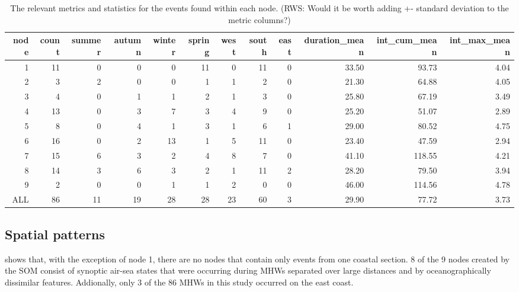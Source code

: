 \documentclass[a4paper,10pt,review]{elsarticle}
\begin{document}
\begin{table}[ht]
\caption{\small The relevant metrics and statistics for the events found within each node. 
(RWS: Would it be worth adding +- standard deviation to the metric columns?)}
\label{table2}
\centering
\tiny
\begin{tabular}{rrrrrrrrrrrr}
  \toprule
node & count & summer & autumn & winter & spring & west & south & east & duration\_mean & int\_cum\_mean & int\_max\_mean \\ 
  \midrule
  1 &  11 &   0 &   0 &   0 &  11 &   0 &  11 &   0 & 33.50 & 93.73 & 4.04 \\ 
  2 &   3 &   2 &   0 &   0 &   1 &   1 &   2 &   0 & 21.30 & 64.88 & 4.05 \\ 
  3 &   4 &   0 &   1 &   1 &   2 &   1 &   3 &   0 & 25.80 & 67.19 & 3.49 \\ 
  4 &  13 &   0 &   3 &   7 &   3 &   4 &   9 &   0 & 25.20 & 51.07 & 2.89 \\ 
  5 &   8 &   0 &   4 &   1 &   3 &   1 &   6 &   1 & 29.00 & 80.52 & 4.75 \\ 
  6 &  16 &   0 &   2 &  13 &   1 &   5 &  11 &   0 & 23.40 & 47.59 & 2.94 \\ 
  7 &  15 &   6 &   3 &   2 &   4 &   8 &   7 &   0 & 41.10 & 118.55 & 4.21 \\ 
  8 &  14 &   3 &   6 &   3 &   2 &   1 &  11 &   2 & 28.20 & 79.50 & 3.94 \\ 
  9 &   2 &   0 &   0 &   1 &   1 &   2 &   0 &   0 & 46.00 & 114.56 & 4.78 \\ 
  ALL &  86 &  11 &  19 &  28 &  28 &  23 &  60 &   3 & 29.90 & 77.72 & 3.73 \\  
  \bottomrule
  \end{tabular}
\end{table}

\subsection{Spatial patterns}
 shows that, with the exception of node 1, there are no nodes that contain only events from one coastal section. 8 of the 9 nodes created by the SOM consist of synoptic air-sea states that were occurring during MHWs separated over large distances and by oceanographically dissimilar features. Addionally, only 3 of the 86 MHWs in this study occurred on the east coast.
\end{document}
